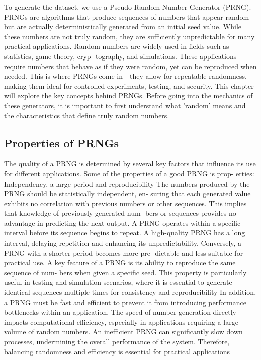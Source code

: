 
	
	To generate the dataset, we use a Pseudo-Random Number Generator (PRNG).
	PRNGs are algorithms that produce sequences of numbers that appear random
	but are actually deterministically generated from an initial seed value. While
	these numbers are not truly random, they are sufficiently unpredictable for many
	practical applications.
	Random numbers are widely used in fields such as statistics, game theory, cryp-
	tography, and simulations. These applications require numbers that behave
	as if they were random, yet can be reproduced when needed. This is where
	PRNGs come in—they allow for repeatable randomness, making them ideal for
	controlled experiments, testing, and security.
	This chapter will explore the key concepts behind PRNGs. Before going into the
	mechanics of these generators, it is important to first understand what ’random’
	means and the characteristics that define truly random numbers.
	
	\subsection{Properties of PRNGs}
	
The quality of a PRNG is determined by several key factors that influence its
use for different applications. Some of the properties of a good PRNG is prop-
erties: Independency, a large period and reproducibility
The numbers produced by the PRNG should be statistically independent, en-
suring that each generated value exhibits no correlation with previous numbers
or other sequences. This implies that knowledge of previously generated num-
bers or sequences provides no advantage in predicting the next output.
A PRNG operates within a specific interval before its sequence begins to repeat.
A high-quality PRNG has a long interval, delaying repetition and enhancing its
unpredictability. Conversely, a PRNG with a shorter period becomes more pre-
dictable and less suitable for practical use.
A key feature of a PRNG is its ability to reproduce the same sequence of num-
bers when given a specific seed. This property is particularly useful in testing
and simulation scenarios, where it is essential to generate identical sequences
multiple times for consistency and reproducibility
In addition, a PRNG must be fast and efficient to prevent it from introducing
performance bottlenecks within an application. The speed of number generation
directly impacts computational efficiency, especially in applications requiring a
large volume of random numbers. An inefficient PRNG can significantly slow
down processes, undermining the overall performance of the system. Therefore,
balancing randomness and efficiency is essential for practical applications
	
